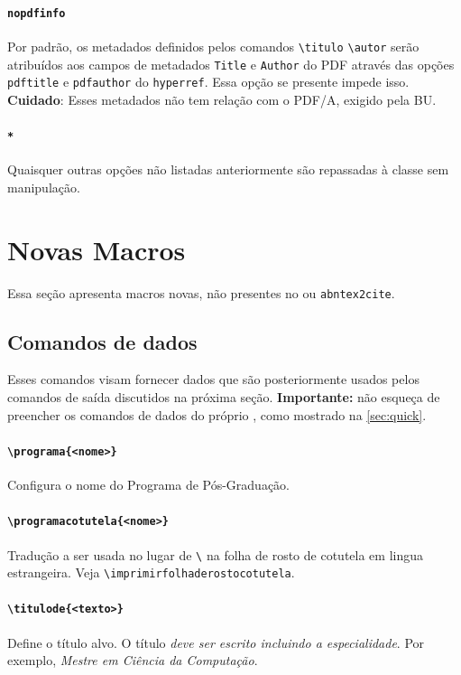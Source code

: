 \documentclass[embeddedlogo]{ufsc-thesis-rn46-2019}
\newcommand{\lacmd}[1]{\texttt{\textbackslash{}#1}}
\begin{document}
\paragraph*{\texttt{nopdfinfo}} Por padrão, os metadados definidos pelos
comandos \lacmd{titulo} \lacmd{autor} serão atribuídos aos campos de metadados
\texttt{Title} e \texttt{Author} do PDF através das opções \texttt{pdftitle} e
\texttt{pdfauthor} do \texttt{hyperref}. Essa opção se presente impede isso.
\textbf{Cuidado}: Esses metadados não tem relação com o PDF/A, exigido pela BU.

\paragraph*{\texttt{*}} Quaisquer outras opções não listadas anteriormente são
repassadas à classe \abnTeX{} sem manipulação.

\section{Novas Macros}

Essa seção apresenta macros novas, não presentes no \abnTeX{} ou
\texttt{abntex2cite}.

\subsection{Comandos de dados}
\label{sec:dados}

Esses comandos visam fornecer dados que são posteriormente usados pelos
comandos de saída discutidos na próxima seção. \textbf{Importante:} não esqueça
de preencher os comandos de dados do próprio \abnTeX, como mostrado na
\autoref{sec:quick}.

\paragraph*{\lacmd{programa\{<nome>\}}} Configura o nome do Programa de
Pós-Graduação.

\paragraph*{\lacmd{programacotutela\{<nome>\}}} Tradução a ser usada no lugar de
\lacmd{\programa} na folha de rosto de cotutela em lingua estrangeira. Veja
\lacmd{imprimirfolhaderostocotutela}.

\paragraph*{\lacmd{titulode\{<texto>\}}} Define o título alvo.  O título
\textit{deve ser escrito incluindo a especialidade}. Por exemplo, \emph{Mestre
  em Ciência da Computação}.
\end{document}
